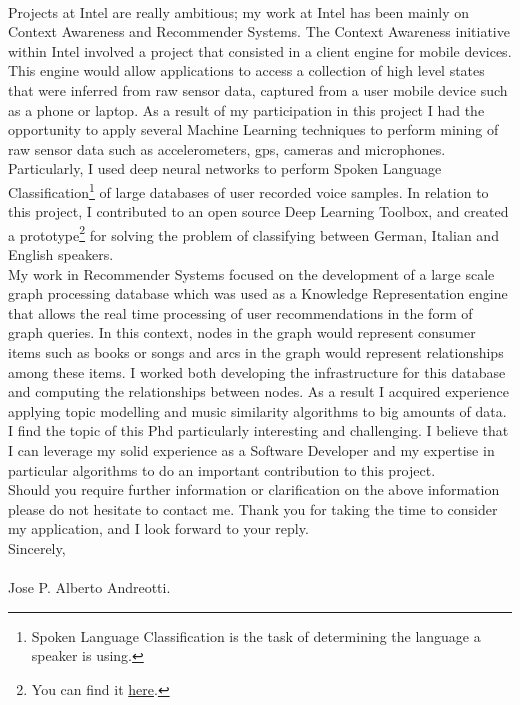 \documentclass[letter,12pt,english]{article}
\begin{document}
\\
Projects at Intel are really ambitious; my work at Intel has been mainly on Context Awareness and 
Recommender Systems. The Context Awareness initiative within Intel involved a project that consisted
in a client engine for mobile devices. This engine would allow applications to access a collection 
of high level states that were inferred from raw sensor data, captured from a user mobile device such
as a phone or laptop.
As a result of my participation in this project I had the opportunity to apply several Machine Learning
techniques to perform mining of raw sensor data such as accelerometers, gps, cameras and microphones.\\
Particularly, I used deep neural networks to perform Spoken Language Classification\footnote{Spoken Language Classification
is the task of determining the language a speaker is using.} of large databases of user recorded voice samples. In relation to this project, I contributed to an 
open source Deep Learning Toolbox, and created a prototype\footnote{You can find it
\href{https://github.com/albertoandreottiATgmail/DeepLearnToolbox/tree/langIdent}{here}.}
for solving the problem of classifying between German, Italian and English speakers.  
\\
My work in Recommender Systems focused on the development of a large scale graph processing database which 
was used as a Knowledge Representation engine that allows the real time processing of user recommendations in 
the form of graph queries. In this context, nodes in the graph would represent consumer items such as books or 
songs and arcs in the graph would represent relationships among these items. I worked both developing the 
infrastructure for this database and computing the relationships between nodes. As a result I acquired experience
applying topic modelling and music similarity algorithms to big amounts of data.
\\
I find the topic of this Phd particularly interesting and challenging. I believe that I can leverage
my solid experience as a Software Developer and my expertise in particular algorithms to do an important
contribution to this project.\\
Should you require further information or clarification on the above information please do not hesitate to contact me.
Thank you for taking the time to consider my application, and I look forward to your reply.
\\

Sincerely,
\\
\\
Jose P. Alberto Andreotti.
\end{document}
